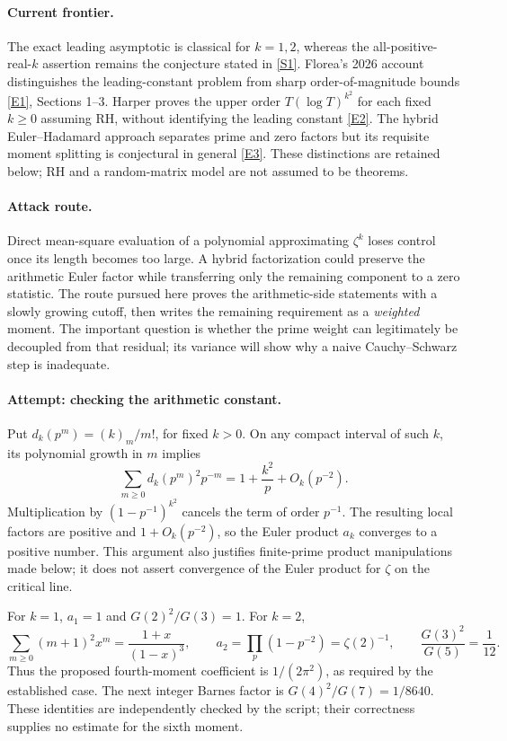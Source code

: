 \documentclass[11pt,a4paper]{article}
\newcommand{\sref}[2]{\hyperlink{source:#1:#2}{[S#2]}}
\newcommand{\eref}[2]{\hyperlink{extra:#1:#2}{[E#2]}}
\numberwithin{equation}{section}
\begin{document}
\paragraph{Current frontier.}
The exact leading asymptotic is classical for $k=1,2$, whereas the
all-positive-real-$k$ assertion remains the conjecture stated in
\sref{162}{1}. Florea's 2026 account distinguishes the leading-constant
problem from sharp order-of-magnitude bounds \eref{162}{1}, Sections
1--3. Harper proves the upper order $T(\log T)^{k^2}$ for each fixed
$k\ge0$ assuming RH, without identifying the leading constant
\eref{162}{2}. The hybrid Euler--Hadamard approach separates prime and
zero factors but its requisite moment splitting is conjectural in general
\eref{162}{3}. These distinctions are retained below; RH and a
random-matrix model are not assumed to be theorems.

\paragraph{Attack route.}
Direct mean-square evaluation of a polynomial approximating $\zeta^k$
loses control once its length becomes too large. A hybrid factorization
could preserve the arithmetic Euler factor while transferring only the
remaining component to a zero statistic. The route pursued here proves
the arithmetic-side statements with a slowly growing cutoff, then writes
the remaining requirement as a \emph{weighted} moment. The important
question is whether the prime weight can legitimately be decoupled from
that residual; its variance will show why a naive Cauchy--Schwarz step
is inadequate.

\paragraph{Attempt: checking the arithmetic constant.}
Put $d_k(p^m)=(k)_m/m!$, for fixed $k>0$. On any compact interval of
such $k$, its polynomial growth in $m$ implies
\[
 \sum_{m\ge0}d_k(p^m)^2p^{-m}=1+\frac{k^2}{p}+O_k(p^{-2}).
\]
Multiplication by $(1-p^{-1})^{k^2}$ cancels the term of order $p^{-1}$.
The resulting local factors are positive and $1+O_k(p^{-2})$, so the
Euler product $a_k$ converges to a positive number. This argument also
justifies finite-prime product manipulations made below; it does not
assert convergence of the Euler product for $\zeta$ on the critical line.

For $k=1$, $a_1=1$ and $G(2)^2/G(3)=1$. For $k=2$,
\[
 \sum_{m\ge0}(m+1)^2x^m=\frac{1+x}{(1-x)^3},\qquad
 a_2=\prod_p(1-p^{-2})=\zeta(2)^{-1},
 \qquad\frac{G(3)^2}{G(5)}=\frac1{12}.
\]
Thus the proposed fourth-moment coefficient is $1/(2\pi^2)$, as required
by the established case. The next integer Barnes factor is
$G(4)^2/G(7)=1/8640$. These identities are independently checked by the
script; their correctness supplies no estimate for the sixth moment.
\end{document}

